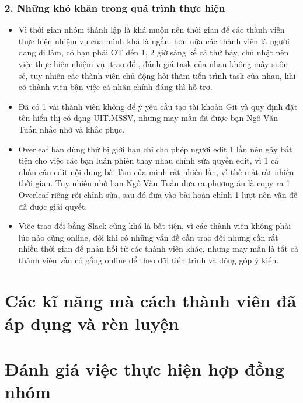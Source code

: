 \documentclass[12pt]{report}
\begin{document}
\subsection*{2. Những khó khăn trong quá trình thực hiện}
\begin{itemize}

    \item Vì thời gian nhóm thành lập là khá muộn nên thời gian để các thành viên thực hiện nhiệm vụ của mình khá là ngắn, hơn nữa các thành viên là người đang đi làm, có bạn phải OT đến 1, 2 giờ sáng kể cả thứ bảy, chủ nhật nên việc thực hiện nhiệm vụ ,trao đổi, đánh giá task của nhau không mấy suôn sẻ, tuy nhiên các thành viên chủ động hỏi thăm tiến trình task của nhau, khi có thành viên bận việc cá nhân chính đáng thì hỗ trợ.
    \item Đã có 1 vài thành viên không dể ý yêu cầu tạo tài khoản Git và quy định đặt tên hiển thị có dạng UIT.MSSV, nhưng may mắn đã được bạn Ngô Văn Tuấn nhắc nhở và khắc phục.
  \item  Overleaf bản dùng thử bị giới hạn chỉ cho phép người edit 1 lần nên gây bất tiện cho việc các bạn luân phiên thay nhau chỉnh sửa quyền edit, vì 1 cá nhân cần edit nội dung bài làm của mình rất nhiều lần, vì thế mất rất nhiều thời gian. Tuy nhiên nhờ bạn Ngô Văn Tuấn đưa ra phương án là copy ra 1 Overleaf riêng rồi chỉnh sửa, sau đó đưa vào bài hoàn chỉnh 1 lượt nên vấn đề đã được giải quyết.
 \item Việc trao đổi bằng Slack cũng khá là bất tiện, vì các thành viên không phải lúc nào cũng online, đôi khi có những vấn đề cần trao đổi nhưng cần rất nhiều thời gian để phản hồi từ các thành viên khác, nhưng may mắn là tất cả thành viên vẫn cố gắng online để theo dõi tiến trình và đóng góp ý kiến.

  \end{itemize}


\chapter{Các kĩ năng mà cách thành viên đã áp dụng và rèn luyện}
\label{sec:used_skills}

\chapter{Đánh giá việc thực hiện hợp đồng nhóm}
\label{sec:member_ratings}
\end{document}
